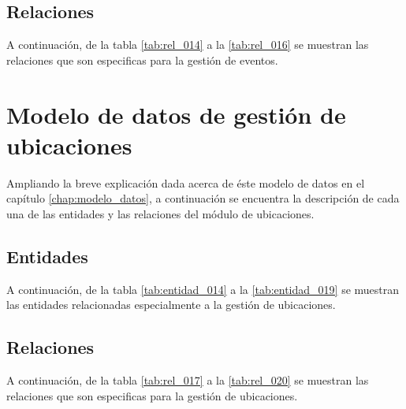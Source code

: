 \clearpage



\subsection{Relaciones}
A continuación, de la tabla \ref{tab:rel_014} a la \ref{tab:rel_016} se muestran las relaciones que son especificas para la gestión de eventos.

\clearpage





\section{Modelo de datos de gestión de ubicaciones}
Ampliando la breve explicación dada acerca de éste modelo de datos en el capítulo \ref{chap:modelo_datos}, a continuación se encuentra la descripción de cada una de las entidades y las relaciones del módulo de ubicaciones.

\subsection{Entidades}
A continuación, de la tabla \ref{tab:entidad_014} a la \ref{tab:entidad_019} se muestran las entidades relacionadas especialmente a la gestión de ubicaciones.

\clearpage







\subsection{Relaciones}
A continuación, de la tabla \ref{tab:rel_017} a la \ref{tab:rel_020} se muestran las relaciones que son especificas para la gestión de ubicaciones.

